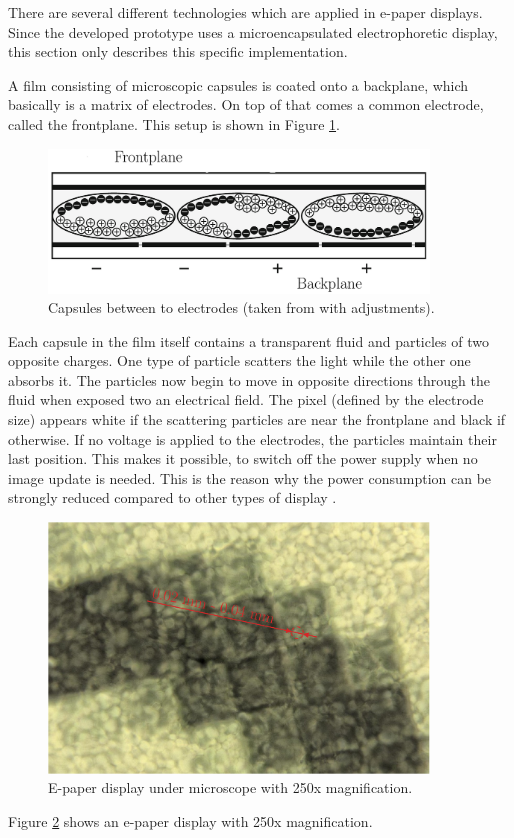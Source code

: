There are several different technologies which are applied in e-paper displays.
Since the developed prototype uses a microencapsulated electrophoretic display, this section only describes this specific implementation.

A film consisting of microscopic capsules is coated onto a backplane, which basically is a matrix of electrodes.
On top of that comes a common electrode, called the frontplane.
This setup is shown in Figure \ref{theory:capsules}.

\begin{figure}[ht]
	\centering
	\includegraphics[width=0.9\textwidth]{2-theory/e-paper-display/graphics/capsules.pdf}
	\caption{Capsules between to electrodes (taken from \cite{amundson} with adjustments).\label{theory:capsules}}
\end{figure}

Each capsule in the film itself contains a transparent fluid and particles of two opposite charges.
One type of particle scatters the light while the other one absorbs it.
The particles now begin to move in opposite directions through the fluid when exposed two an electrical field. 
The pixel (defined by the electrode size) appears white if the scattering particles are near the frontplane and black if otherwise.
If no voltage is applied to the electrodes, the particles maintain their last position.
This makes it possible, to switch off the power supply when no image update is needed. 
This is the reason why the power consumption can be strongly reduced compared to other types of display \cite{amundson}.

\begin{figure}[ht]
	\centering
	\includegraphics[width=0.9\textwidth]{2-theory/e-paper-display/graphics/epaper_mikroskop.pdf}
	\caption{E-paper display under microscope with 250x magnification.\label{theory:micro}}
\end{figure}

Figure \ref{theory:micro} shows an e-paper display with 250x magnification.